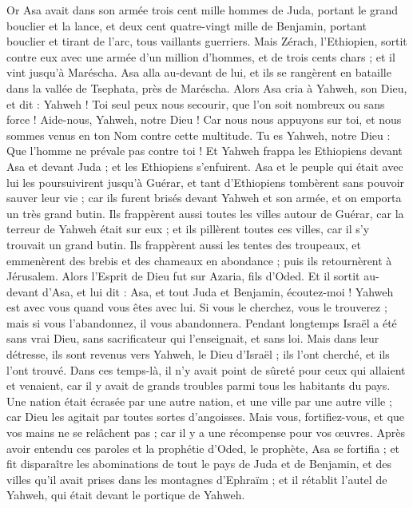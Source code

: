 \begin{multicols}{2}
Or Asa avait dans son armée trois cent mille hommes de Juda, portant le grand bouclier et la lance, et deux cent quatre-vingt mille de Benjamin, portant bouclier et tirant de l'arc, tous vaillants guerriers.
Mais Zérach, l'Ethiopien, sortit contre eux avec une armée d'un million d'hommes, et de trois cents chars ; et il vint jusqu'à Maréscha.
Asa alla au-devant de lui, et ils se rangèrent en bataille dans la vallée de Tsephata, près de Maréscha.
Alors Asa cria à Yahweh, son Dieu, et dit : Yahweh ! Toi seul peux nous secourir, que l'on soit nombreux ou sans force ! Aide-nous, Yahweh, notre Dieu ! Car nous nous appuyons sur toi, et nous sommes venus en ton Nom contre cette multitude. Tu es Yahweh, notre Dieu : Que l'homme ne prévale pas contre toi !
Et Yahweh frappa les Ethiopiens devant Asa et devant Juda ; et les Ethiopiens s'enfuirent.
Asa et le peuple qui était avec lui les poursuivirent jusqu'à Guérar, et tant d'Ethiopiens tombèrent sans pouvoir sauver leur vie ; car ils furent brisés devant Yahweh et son armée, et on emporta un très grand butin.
Ils frappèrent aussi toutes les villes autour de Guérar, car la terreur de Yahweh était sur eux ; et ils pillèrent toutes ces villes, car il s'y trouvait un grand butin.
Ils frappèrent aussi les tentes des troupeaux, et emmenèrent des brebis et des chameaux en abondance ; puis ils retournèrent à Jérusalem.
\VerseOne{}Alors l'Esprit de Dieu fut sur Azaria, fils d'Oded.
Et il sortit au-devant d'Asa, et lui dit : Asa, et tout Juda et Benjamin, écoutez-moi ! Yahweh est avec vous quand vous êtes avec lui. Si vous le cherchez, vous le trouverez ; mais si vous l'abandonnez, il vous abandonnera.
Pendant longtemps Israël a été sans vrai Dieu, sans sacrificateur qui l'enseignait, et sans loi.
Mais dans leur détresse, ils sont revenus vers Yahweh, le Dieu d'Israël ; ils l'ont cherché, et ils l'ont trouvé.
Dans ces temps-là, il n'y avait point de sûreté pour ceux qui allaient et venaient, car il y avait de grands troubles parmi tous les habitants du pays.
Une nation était écrasée par une autre nation, et une ville par une autre ville ; car Dieu les agitait par toutes sortes d'angoisses.
Mais vous, fortifiez-vous, et que vos mains ne se relâchent pas ; car il y a une récompense pour vos œuvres.
Après avoir entendu ces paroles et la prophétie d'Oded, le prophète, Asa se fortifia ; et fit disparaître les abominations de tout le pays de Juda et de Benjamin, et des villes qu'il avait prises dans les montagnes d'Ephraïm ; et il rétablit l'autel de Yahweh, qui était devant le portique de Yahweh.

\end{multicols}
